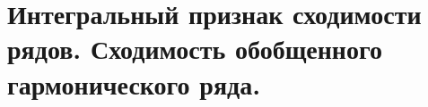{
	\section{Интегральный признак сходимости рядов. Сходимость обобщенного гармонического ряда.}

	\newpage
}